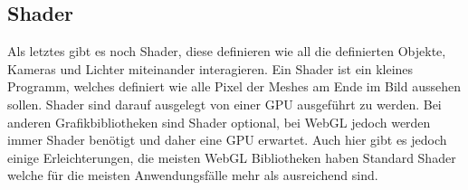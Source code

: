 \subsection{Shader}
Als letztes gibt es noch Shader, diese definieren wie all die definierten Objekte, Kameras und Lichter miteinander interagieren.
Ein Shader ist ein kleines Programm, welches definiert wie alle Pixel der Meshes am Ende im Bild aussehen sollen.
Shader sind darauf ausgelegt von einer \ac{GPU} ausgeführt zu werden.
Bei anderen Grafikbibliotheken sind Shader optional, bei WebGL jedoch werden immer Shader benötigt und daher eine \ac{GPU} erwartet.
Auch hier gibt es jedoch einige Erleichterungen, die meisten WebGL Bibliotheken haben Standard Shader welche für die meisten Anwendungsfälle mehr als ausreichend sind. \cite[7-9]{parisi2012webgl}